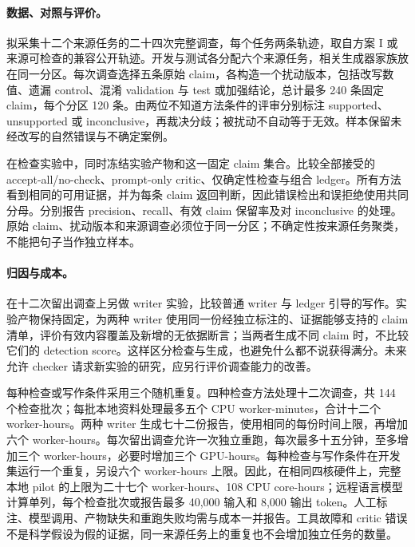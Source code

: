 \paragraph{数据、对照与评价。}
拟采集十二个来源任务的二十四次完整调查，每个任务两条轨迹，取自方案 I 或来源可检查的兼容公开轨迹。开发与测试各分配六个来源任务，相关生成器家族放在同一分区。每次调查选择五条原始 claim，各构造一个扰动版本，包括改写数值、遗漏 control、混淆 validation 与 test 或加强结论，总计最多 240 条固定 claim，每个分区 120 条。由两位不知道方法条件的评审分别标注 supported、unsupported 或 inconclusive，再裁决分歧；被扰动不自动等于无效。样本保留未经改写的自然错误与不确定案例。

在检查实验中，同时冻结实验产物和这一固定 claim 集合。比较全部接受的 accept-all/no-check、prompt-only critic、仅确定性检查与组合 ledger。所有方法看到相同的可用证据，并为每条 claim 返回判断，因此错误检出和误拒绝使用共同分母。分别报告 precision、recall、有效 claim 保留率及对 inconclusive 的处理。原始 claim、扰动版本和来源调查必须位于同一分区；不确定性按来源任务聚类，不能把句子当作独立样本。

\paragraph{归因与成本。}
在十二次留出调查上另做 writer 实验，比较普通 writer 与 ledger 引导的写作。实验产物保持固定，为两种 writer 使用同一份经独立标注的、证据能够支持的 claim 清单，评价有效内容覆盖及新增的无依据断言；当两者生成不同 claim 时，不比较它们的 detection score。这样区分检查与生成，也避免什么都不说获得满分。未来允许 checker 请求新实验的研究，应另行评价调查能力的改善。

每种检查或写作条件采用三个随机重复。四种检查方法处理十二次调查，共 144 个检查批次；每批本地资料处理最多五个 CPU worker-minutes，合计十二个 worker-hours。两种 writer 生成七十二份报告，使用相同的每份时间上限，再增加六个 worker-hours。每次留出调查允许一次独立重跑，每次最多十五分钟，至多增加三个 worker-hours，必要时增加三个 GPU-hours。每种检查与写作条件在开发集运行一个重复，另设六个 worker-hours 上限。因此，在相同四核硬件上，完整本地 pilot 的上限为二十七个 worker-hours、108 CPU core-hours；远程语言模型计算单列，每个检查批次或报告最多 40,000 输入和 8,000 输出 token。人工标注、模型调用、产物缺失和重跑失败均需与成本一并报告。工具故障和 critic 错误不是科学假设为假的证据，同一来源任务上的重复也不会增加独立任务的数量。
